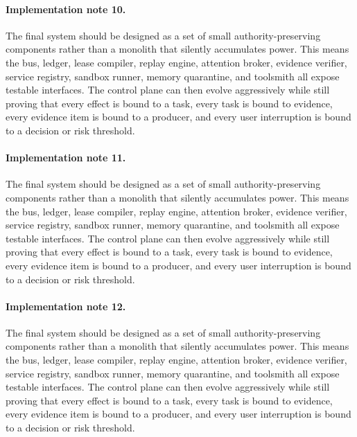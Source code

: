 \documentclass[10pt,journal,onecolumn]{IEEEtran}
\begin{document}
\paragraph{Implementation note 10.} The final system should be designed as a set of small authority-preserving components rather than a monolith that silently accumulates power. This means the bus, ledger, lease compiler, replay engine, attention broker, evidence verifier, service registry, sandbox runner, memory quarantine, and toolsmith all expose testable interfaces. The control plane can then evolve aggressively while still proving that every effect is bound to a task, every task is bound to evidence, every evidence item is bound to a producer, and every user interruption is bound to a decision or risk threshold.
\paragraph{Implementation note 11.} The final system should be designed as a set of small authority-preserving components rather than a monolith that silently accumulates power. This means the bus, ledger, lease compiler, replay engine, attention broker, evidence verifier, service registry, sandbox runner, memory quarantine, and toolsmith all expose testable interfaces. The control plane can then evolve aggressively while still proving that every effect is bound to a task, every task is bound to evidence, every evidence item is bound to a producer, and every user interruption is bound to a decision or risk threshold.
\paragraph{Implementation note 12.} The final system should be designed as a set of small authority-preserving components rather than a monolith that silently accumulates power. This means the bus, ledger, lease compiler, replay engine, attention broker, evidence verifier, service registry, sandbox runner, memory quarantine, and toolsmith all expose testable interfaces. The control plane can then evolve aggressively while still proving that every effect is bound to a task, every task is bound to evidence, every evidence item is bound to a producer, and every user interruption is bound to a decision or risk threshold.
\end{document}
